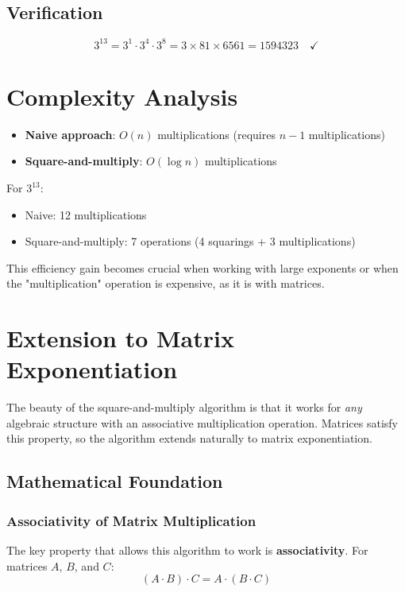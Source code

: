 \documentclass{article}
\begin{document}
	\subsection{Verification}
	
	\[
	3^{13} = 3^1 \cdot 3^4 \cdot 3^8 = 3 \times 81 \times 6561 = 1594323 \quad \checkmark
	\]
	
	\section{Complexity Analysis}
	
	\begin{itemize}
		\item \textbf{Naive approach}: $O(n)$ multiplications (requires $n-1$ multiplications)
		\item \textbf{Square-and-multiply}: $O(\log n)$ multiplications
	\end{itemize}
	
	For $3^{13}$:
	\begin{itemize}
		\item Naive: 12 multiplications
		\item Square-and-multiply: 7 operations (4 squarings + 3 multiplications)
	\end{itemize}
	
	This efficiency gain becomes crucial when working with large exponents or when the "multiplication" operation is expensive, as it is with matrices.
	
	\section{Extension to Matrix Exponentiation}
	
	The beauty of the square-and-multiply algorithm is that it works for \emph{any} algebraic structure with an associative multiplication operation. Matrices satisfy this property, so the algorithm extends naturally to matrix exponentiation.
	
	\subsection{Mathematical Foundation}
	
	\subsubsection{Associativity of Matrix Multiplication}
	
	The key property that allows this algorithm to work is \textbf{associativity}. For matrices $A$, $B$, and $C$:
	\[
	(A \cdot B) \cdot C = A \cdot (B \cdot C)
	\]
	
\end{document}
